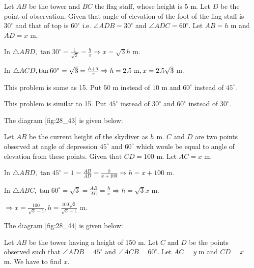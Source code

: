   \startplacefigure[reference=fig:28_40]
    \externalfigure[28_40.pdf]
  \stopplacefigure

  Let $AB$ be the tower and $BC$ the flag staff, whose height is $5$ m. Let $D$ be the point of
  observation. Given that angle of elevation of the foot of the flag staff is $30^\circ$ and that of top is
  $60^\circ$ i.e. $\angle ADB = 30^\circ$ and $\angle ADC = 60^\circ$. Let $AB = h$ m and $AD =
  x$ m.

  In $\triangle ABD, \tan30^\circ = \frac{1}{\sqrt{3}} = \frac{h}{x} \Rightarrow x = \sqrt{3}h$ m.

  In $\triangle ACD, \tan60^\circ = \sqrt{3} = \frac{h + 5}{x} \Rightarrow h = 2.5~{\rm m}, x = 2.5\sqrt{3}$ m.

\item This problem is same as 15. Put $50$ m instead of $10$ m and $60^\circ$ instead of $45^\circ$.

\item This problem is similar to 15. Put $45^\circ$ instead of $30^\circ$ and $60^\circ$ instead of
  $30^\circ$.

\item The diagram [fig:28_43] is given below:

  \startplacefigure[reference=fig:28_43]
    \externalfigure[28_43.pdf]
  \stopplacefigure

  Let $AB$ be the current height of the skydiver as $h$ m. $C$ and $D$ are two points observed at angle of
  depression $45^\circ$ and $60^\circ$ which woule be equal to angle of elevation from these points. Given that
  $CD = 100$ m. Let $AC = x$ m.

  In $\triangle ABD, \tan45^\circ = 1 = \frac{AB}{AD} = \frac{h}{x + 100} \Rightarrow h = x + 100$ m.

  In $\triangle ABC, \tan60^\circ = \sqrt{3} = \frac{AB}{AC} = \frac{h}{x} \Rightarrow h = \sqrt{3}x$ m.

  $\Rightarrow x = \frac{100}{\sqrt{3} - 1}, h = \frac{100\sqrt{3}}{\sqrt{3} - 1}$ m.

\item The diagram [fig:28_44] is given below:

  \startplacefigure[reference=fig:28_44]
    \externalfigure[28_44.pdf]
  \stopplacefigure

  Let $AB$ be the tower having a height of $150$ m. Let $C$ and $D$ be the points observed such that
  $\angle ADB = 45^\circ$ and $\angle ACB = 60^\circ$. Let $AC = y$ m and $CD = x$ m. We have to find
  $x$.

